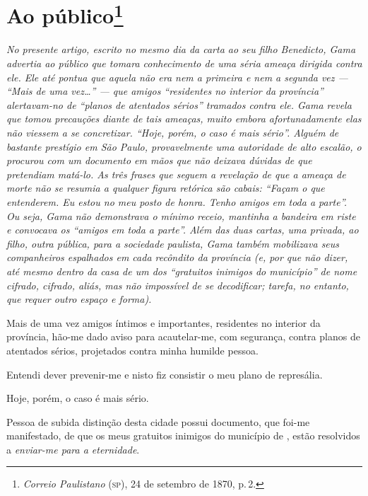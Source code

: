 \chapter{Ao público\footnote{\emph{Correio Paulistano} (\textsc{sp}), 24 de setembro de 1870, p.\,2.}} %


\begin{didascalia}
\emph{No presente artigo, escrito no mesmo dia da carta ao seu filho
Benedicto, Gama advertia ao público que tomara conhecimento de uma séria
ameaça dirigida contra ele. Ele até pontua que aquela não era nem a
primeira e nem a segunda vez --- ``Mais de uma vez\ldots{}'' --- que amigos
``residentes no interior da província'' alertavam-no de ``planos de
atentados sérios'' tramados contra ele. Gama revela que tomou precauções
diante de tais ameaças, muito embora afortunadamente elas não viessem a
se concretizar. ``Hoje, porém, o caso é mais sério''. Alguém de bastante
prestígio em São Paulo, provavelmente uma autoridade de alto escalão, o
procurou com um documento em mãos que não deixava dúvidas de que
pretendiam matá-lo. As três frases que seguem a revelação de que a
ameaça de morte não se resumia a qualquer figura retórica são cabais:
``Façam o que entenderem. Eu estou no meu posto de honra. Tenho amigos em
toda a parte''. Ou seja, Gama não demonstrava o mínimo receio, mantinha a
bandeira em riste e convocava os ``amigos em toda a parte''. Além das duas
cartas, uma privada, ao filho, outra pública, para a sociedade paulista,
Gama também mobilizava seus companheiros espalhados em cada recôndito da
província (e, por que não dizer, até mesmo dentro da casa de um dos
``gratuitos inimigos do município'' de nome cifrado, cifrado, aliás, mas
não impossível de se decodificar; tarefa, no entanto, que requer outro
espaço e forma).}
\end{didascalia}


Mais de uma vez amigos íntimos e importantes, residentes no interior da
província, hão-me dado aviso para acautelar-me, com segurança, contra
planos de atentados sérios, projetados contra minha humilde pessoa.

Entendi dever prevenir-me e nisto fiz consistir o meu plano de
represália.

Hoje, porém, o caso é mais sério.

Pessoa de subida distinção desta cidade possui documento, que foi-me
manifestado, de que os meus gratuitos inimigos do município de \asterisc{},
estão resolvidos a \emph{enviar-me para a eternidade}.

